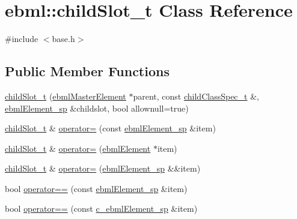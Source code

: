 \hypertarget{classebml_1_1childSlot__t}{}\section{ebml\+:\+:child\+Slot\+\_\+t Class Reference}
\label{classebml_1_1childSlot__t}


{\ttfamily \#include $<$base.\+h$>$}

\subsection*{Public Member Functions}
\begin{DoxyCompactItemize}
\item 
\mbox{\hyperlink{classebml_1_1childSlot__t_a192a6c2040bab86ad5658aed5f30551d}{child\+Slot\+\_\+t}} (\mbox{\hyperlink{classebml_1_1ebmlMasterElement}{ebml\+Master\+Element}} $\ast$parent, const \mbox{\hyperlink{classebml_1_1childClassSpec__t}{child\+Class\+Spec\+\_\+t}} \&, \mbox{\hyperlink{namespaceebml_adad533b7705a16bb360fe56380c5e7be}{ebml\+Element\+\_\+sp}} \&childslot, bool allownull=true)
\item 
\mbox{\hyperlink{classebml_1_1childSlot__t}{child\+Slot\+\_\+t}} \& \mbox{\hyperlink{classebml_1_1childSlot__t_a96a35fa33df87f8294679f6e35cc1aa5}{operator=}} (const \mbox{\hyperlink{namespaceebml_adad533b7705a16bb360fe56380c5e7be}{ebml\+Element\+\_\+sp}} \&item)
\item 
\mbox{\hyperlink{classebml_1_1childSlot__t}{child\+Slot\+\_\+t}} \& \mbox{\hyperlink{classebml_1_1childSlot__t_a5519b06a0a0d2f81a67946a810d2bdbe}{operator=}} (\mbox{\hyperlink{classebml_1_1ebmlElement}{ebml\+Element}} $\ast$item)
\item 
\mbox{\hyperlink{classebml_1_1childSlot__t}{child\+Slot\+\_\+t}} \& \mbox{\hyperlink{classebml_1_1childSlot__t_a2ba7c72c369a0809108f00b547a3cd80}{operator=}} (\mbox{\hyperlink{namespaceebml_adad533b7705a16bb360fe56380c5e7be}{ebml\+Element\+\_\+sp}} \&\&item)
\item 
bool \mbox{\hyperlink{classebml_1_1childSlot__t_a80a7118d11ff7651bb173a4a2d599fa1}{operator==}} (const \mbox{\hyperlink{namespaceebml_adad533b7705a16bb360fe56380c5e7be}{ebml\+Element\+\_\+sp}} \&item)
\item 
bool \mbox{\hyperlink{classebml_1_1childSlot__t_a1fc9c424a86ba33d68b6a280f3c3fd83}{operator==}} (const \mbox{\hyperlink{namespaceebml_a2deef4e8071531b32e3533f1bf978917}{c\+\_\+ebml\+Element\+\_\+sp}} \&item)
\item 

\end{DoxyCompactItemize}
